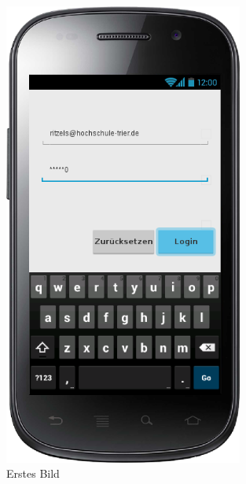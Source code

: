 \begin{figure}[htbp] 
  \centering
     \includegraphics[width=0.7\textwidth]{anhang/mockups/loginnext.png}
  \caption{Erstes Bild}
  \label{fig:Bild1}
\end{figure}